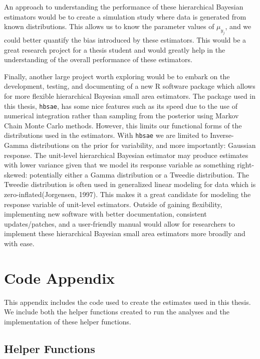 \documentclass[12pt,twoside]{reedthesis}
\begin{document}
An approach to understanding the performance of these hierarchical Bayesian estimators would be to create a simulation study where data is generated from known distributions. This allows us to know the parameter values of \(\mu_{y_j}\), and we could better quantify the bias introduced by these estimators. This would be a great research project for a thesis student and would greatly help in the understanding of the overall performance of these estimators.

Finally, another large project worth exploring would be to embark on the development, testing, and documenting of a new R software package which allows for more flexible hierarchical Bayesian small area estimators. The package used in this thesis, \texttt{hbsae}, has some nice features such as its speed due to the use of numerical integration rather than sampling from the posterior using Markov Chain Monte Carlo methods. However, this limits our functional forms of the distributions used in the estimators. With \texttt{hbsae} we are limited to Inverse-Gamma distributions on the prior for variability, and more importantly: Gaussian response. The unit-level hierarchical Bayesian estimator may produce estimates with lower variance given that we model its response variable as something right-skewed: potentially either a Gamma distribution or a Tweedie distribution. The Tweedie distribution is often used in generalized linear modeling for data which is zero-inflated(Jorgensen, 1997). This makes it a great candidate for modeling the response variable of unit-level estimators. Outside of gaining flexibility, implementing new software with better documentation, consistent updates/patches, and a user-friendly manual would allow for researchers to implement these hierarchical Bayesian small area estimators more broadly and with ease.

\appendix

\hypertarget{code-appendix}{%
\chapter{Code Appendix}\label{code-appendix}}

This appendix includes the code used to create the estimates used in this thesis. We include both the helper functions created to run the analyses and the implementation of these helper functions.

\hypertarget{helper-functions}{%
\section{Helper Functions}\label{helper-functions}}
\end{document}
